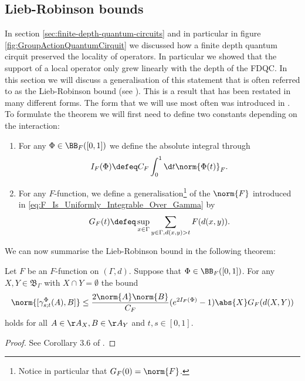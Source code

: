\subsection{Lieb-Robinson bounds}
In section \ref{sec:finite-depth-quantum-circuits} and in particular in figure \ref{fig:GroupActionQuantumCirquit} we discussed how a finite depth quantum cirquit preserved the locality of operators. In particular we showed that the support of a local operator only grew linearly with the depth of the FDQC. In this section we will discuss a generalisation of this statement that is often referred to as the Lieb-Robinson bound (see \cite{Lieb:1972ts}). This is a result that has been restated in many different forms. The form that we will use most often was introduced in \cite{nachtergaele2019quasi}. To formulate the theorem we will first need to define two constants depending on the interaction:
\begin{enumerate}
	\item For any $\Phi\in\BB_F([0,1])$ we define the absolute integral through
	\begin{equation}
	I_F(\Phi)\defeq C_F\int_0^1 \d t \norm{\Phi(t)}_F.
	\end{equation}
	\item For any $F$-function, we define a generalisation\footnote{Notice in particular that $G_F(0)=\norm{F}$.} of the $\norm{F}$ introduced in \ref{eq:F_Is_Uniformly_Integrable_Over_Gamma} by
	\begin{equation}
	G_F(t)\defeq \sup_{x\in\Gamma}\sum_{y\in\Gamma,d(x,y)>t}F(d(x,y)).
	\end{equation}
\end{enumerate}
We can now summarise the Lieb-Robinson bound in the following theorem:
\begin{theorem}
	Let $F$ be an $F$-function on $(\Gamma,d)$. Suppose that $\Phi\in\BB_F([0,1])$. For any $X,Y\in\mathfrak{B}_\Gamma$ with $X\cap Y=\emptyset$ the bound
	\begin{equation}
	\norm{[\gamma_{s;t}^{\Phi}(A),B]}\leq \frac{2\norm{A}\norm{B}}{C_F}(e^{2I_F(\Phi)}-1)\abs{X}G_F(d(X,Y))
	\end{equation}
	holds for all $A\in\AA_X,B\in\AA_Y$ and $t,s\in[0,1]$.
\end{theorem}
\begin{proof}
	See Corollary 3.6 of \cite{nachtergaele2019quasi}.
\end{proof}
